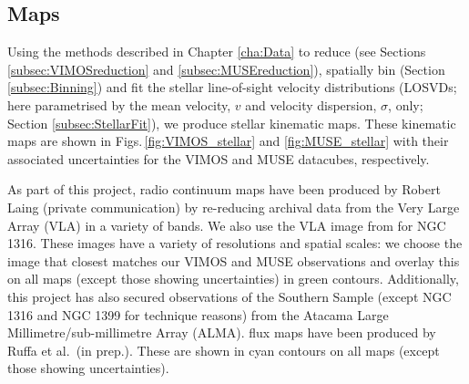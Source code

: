 	\subsection{Maps}
		\label{subsec:maps}
		Using the methods described in Chapter \ref{cha:Data} to reduce (see Sections \ref{subsec:VIMOSreduction} and \ref{subsec:MUSEreduction}), spatially bin (Section \ref{subsec:Binning}) and fit the stellar line-of-sight velocity distributions (LOSVDs; here parametrised by the mean velocity, $v$ and velocity dispersion, $\sigma$, only; Section \ref{subsec:StellarFit}), we produce stellar kinematic maps. These kinematic maps are shown in Figs.\,\ref{fig:VIMOS_stellar} and \ref{fig:MUSE_stellar} with their associated uncertainties for the VIMOS and MUSE datacubes, respectively. 

		As part of this project, radio continuum maps have been produced by Robert Laing (private communication) by re-reducing archival data from the Very Large Array (VLA) in a variety of bands. We also use the VLA image from \citet{Lanz2010} for NGC 1316. These images have a variety of resolutions and spatial scales: we choose the image that closest matches our VIMOS and MUSE observations and overlay this on all maps (except those showing uncertainties) in green contours. Additionally, this project has also secured observations of the Southern Sample (except NGC 1316 and NGC 1399 for technique reasons) from the Atacama Large Millimetre/sub-millimetre Array (ALMA).  flux maps have been produced by Ruffa et al.\ (in prep.). These are shown in cyan contours on all maps (except those showing uncertainties). 

